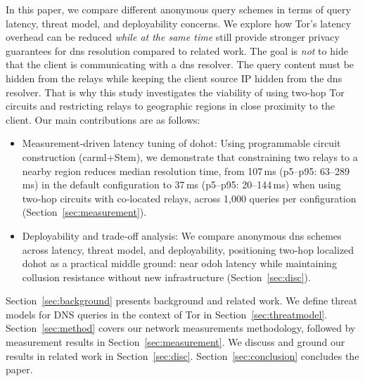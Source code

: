 In this paper, we compare different anonymous query schemes in terms of query
latency, threat model, and deployability concerns. We explore how Tor's
latency overhead can be reduced \emph{while at the same time} still provide
stronger privacy guarantees for \ac{dns} resolution compared to related work. 
The goal is \emph{not} to hide that the client is communicating with a \ac{dns}
resolver. The query content must be hidden from the relays while keeping the
client source IP hidden from the \ac{dns} resolver. That is why this study
investigates the viability of using two-hop Tor circuits and restricting relays
to geographic regions in close proximity to the client. Our main contributions
are as follows:

\begin{itemize}
    \item Measurement‑driven latency tuning of \acs{dohot}: Using programmable
        circuit construction (carml+Stem), we demonstrate that constraining two
        relays to a nearby region reduces median resolution time, from 107\,ms
        (p5--p95: 63--289\,ms) in the default configuration to 37\,ms (p5--p95:
        20--144\,ms) when using two‑hop circuits with co‑located relays, across
        1,000 queries per configuration (Section~\ref{sec:measurement}).
    \item Deployability and trade‑off analysis: We compare anonymous \ac{dns}
        schemes across latency, threat model, and deployability, positioning
        two‑hop localized \acs{dohot} as a practical middle ground: near
        \ac{odoh} latency while maintaining collusion resistance without new
        infrastructure (Section~\ref{sec:disc}).
\end{itemize}

Section~\ref{sec:background} presents background and related work. We define
threat models for DNS queries in the context of Tor in
Section~\ref{sec:threatmodel}. Section~\ref{sec:method} covers our network
measurements methodology, followed by measurement results in
Section~\ref{sec:measurement}. We discuss and ground our results in related work
in Section~\ref{sec:disc}. Section~\ref{sec:conclusion} concludes the paper.
